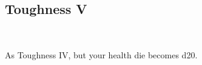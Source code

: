 \subsection*{Toughness V}\label{feat:toughness5}
 \\

As Toughness IV, but your health die becomes d20.

